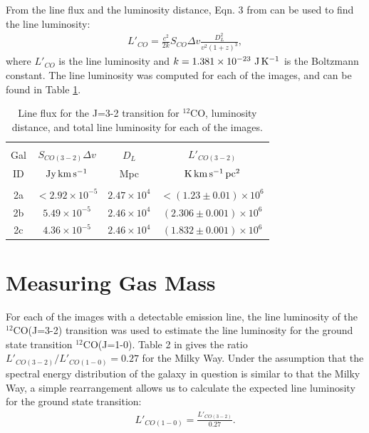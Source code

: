 \documentclass[11pt]{article}
\begin{document}
From the line flux and the luminosity distance, Eqn. 3 from \cite{Solomon1992} can be used to find the line luminosity:
\begin{align}\label{eqn:linelum}
	L'_{CO} = \frac{c^2}{2k}S_{CO}\Delta v \frac{D_L^2}{v^2 (1+z)^3},
\end{align}
where $L'_{CO}$ is the line luminosity and $k = 1.381\times 10^{-23}~{\rm J\,K^{-1}}$ is the Boltzmann constant. The line luminosity was computed for each of the images, and can be found in Table \ref{table:line_lum}.

\begin{table}[!htbp]
\centering
\begin{tabular}{cccc}
\hline \\[-0.25cm]
Gal & $S_{CO(3-2)}\Delta v$ & $D_L$ & $L'_{CO(3-2)}$ \\
ID  & $\rm{Jy\,km\,s^{-1}}$ & Mpc   & $\rm{K\,km\,s^{-1}\,pc^2}$ \\[0.1cm]
\hline \\[-0.25cm]
2a & $<2.92\times 10^{-5}$ & $2.47\times 10^{4}$ & $<(1.23 \pm 0.01)\times 10^{6}$   \\
2b & $5.49\times 10^{-5}$  & $2.46\times 10^{4}$ & $(2.306 \pm 0.001)\times 10^{6}$  \\
2c & $4.36\times 10^{-5}$  & $2.46\times 10^{4}$ & $(1.832 \pm 0.001)\times 10^{6}$  \\
\hline
\end{tabular}
\caption{Line flux for the J=3-2 transition for $^{12}$CO, luminosity distance, and total line luminosity for each of the images.}
\label{table:line_lum}
\end{table}

\section*{Measuring Gas Mass}

For each of the images with a detectable emission line, the line luminosity of the $^{12}$CO(J=3-2) transition was used to estimate the line luminosity for the ground state transition $^{12}$CO(J=1-0). Table 2 in \cite{Carilli2013} gives the ratio $L'_{CO(3-2)} / L'_{CO(1-0)} = 0.27$ for the Milky Way. Under the assumption that the spectral energy distribution of the galaxy in question is similar to that the Milky Way, a simple rearrangement allows us to calculate the expected line luminosity for the ground state transition:
\begin{align}\label{eqn:ground_linelum}
	L'_{CO(1-0)} = \frac{L'_{CO(3-2)}}{0.27}.
\end{align}
\end{document}
